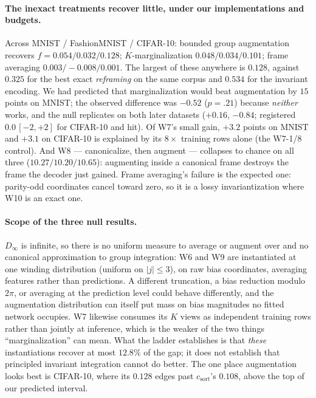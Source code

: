 \documentclass[10pt,twocolumn,letterpaper]{article}
\theoremstyle{definition}
\newcommand{\Dinf}{D_\infty}
\newcommand{\csort}{c_{\mathrm{sort}}}
\begin{document}


\paragraph{The inexact treatments recover little, under our implementations and budgets.} Across
MNIST / FashionMNIST / CIFAR-10: bounded group augmentation recovers $f = 0.054 / 0.032 / 0.128$;
$K$-marginalization $0.048 / 0.034 / 0.101$; frame averaging $0.003 / -0.008 / 0.001$. The largest
of these anywhere is $0.128$, against $0.325$ for the best exact \emph{reframing} on the same
corpus and $0.534$ for the invariant encoding. We had
predicted that marginalization would beat augmentation by $15$ points on MNIST; the observed
difference was $-0.52$ ($p = .21$) because \emph{neither} works, and the null replicates on both
later datasets ($+0.16$, $-0.84$; registered $0.0\,[-2,+2]$ for CIFAR-10 and hit). Of W7's small
gain, $+3.2$ points on MNIST and $+3.1$ on CIFAR-10 is explained by its $8\times$ training rows
alone (the W7-1/8 control). And W8 --- canonicalize, then augment --- collapses to chance on all
three ($10.27 / 10.20 / 10.65$): augmenting inside a canonical frame destroys the frame the
decoder just gained. Frame averaging's failure is the expected one: parity-odd coordinates cancel
toward zero, so it is a lossy invariantization where W10 is an exact one.

\paragraph{Scope of the three null results.} $\Dinf$ is infinite, so there is no uniform measure to
average or augment over and no canonical approximation to group integration: W6 and W9 are
instantiated at one winding distribution (uniform on $|j|\le3$), on raw bias coordinates, averaging
features rather than predictions. A different truncation, a bias reduction modulo $2\pi$, or
averaging at the prediction level could behave differently, and the augmentation distribution can
itself put mass on bias magnitudes no fitted network occupies. W7 likewise consumes its $K$ views as
independent training rows rather than jointly at inference, which is the weaker of the two things
``marginalization'' can mean. What the ladder establishes is that \emph{these} instantiations
recover at most $12.8\%$ of the gap; it does not establish that principled invariant integration
cannot do better. The one place augmentation looks best is CIFAR-10, where its $0.128$ edges past
$\csort$'s $0.108$, above the top of our predicted interval.
\end{document}
